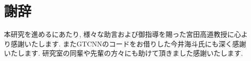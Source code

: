\documentclass[a4paper,12pt,report]{jsbook}
\begin{document}



\setcounter{tocdepth}{3}
\tableofcontents


\newpage
{}
\setcounter{page}{1}









\chapter*{謝辞}
本研究を進めるにあたり, 様々な助言および御指導を賜った宮田高道教授に心より感謝いたします. またGTCNNのコードをお借りした今井海斗氏にも深く感謝いたします. 研究室の同輩や先輩の方々にも助けて頂きました感謝いたします.

\nocite{*}
\cleardoublepage
\pagestyle{plain}





\end{document}
